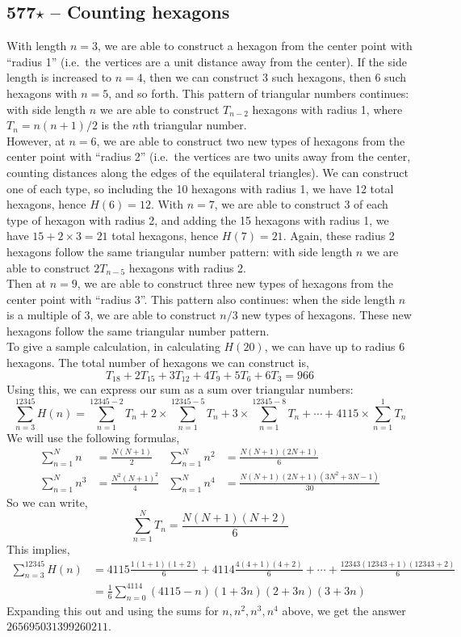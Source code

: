 \documentclass{article}
\begin{document}
\subsection*{577$\star$ -- Counting hexagons}
With length $n=3$, we are able to construct a hexagon from the center point with ``radius 1'' (i.e.~the vertices are a unit distance away from the center).
If the side length is increased to $n=4$, then we can construct 3 such hexagons, then 6 such hexagons with $n=5$, and so forth.
This pattern of triangular numbers continues: with side length $n$ we are able to construct $T_{n-2}$ hexagons with radius 1, where $T_n = n(n+1)/2$ is the $n$th triangular number. \\

However, at $n=6$, we are able to construct two new types of hexagons from the center point with ``radius 2'' (i.e.~the vertices are two units away from the center, counting distances along the edges of the equilateral triangles). 
We can construct one of each type, so including the 10 hexagons with radius 1, we have 12 total hexagons, hence $H(6)=12$.
With $n=7$, we are able to construct 3 of each type of hexagon with radius 2, and adding the 15 hexagons with radius 1, we have $15 + 2\times 3 = 21$ total hexagons, hence $H(7)=21$.
Again, these radius 2 hexagons follow the same triangular number pattern: with side length $n$ we are able to construct $2T_{n-5}$ hexagons with radius 2. \\

Then at $n=9$, we are able to construct three new types of hexagons from the center point with ``radius 3''.
This pattern also continues: when the side length $n$ is a multiple of 3, we are able to construct $n/3$ new types of hexagons.
These new hexagons follow the same triangular number pattern. \\

To give a sample calculation, in calculating $H(20)$, we can have up to radius 6 hexagons.
The total number of hexagons we can construct is,
\[ T_{18} + 2T_{15} + 3 T_{12} + 4 T_{9} + 5 T_{6} + 6 T_{3} = 966 \]
Using this, we can express our sum as a sum over triangular numbers:
\[ \sum_{n=3}^{12345} H(n) = \sum_{n=1}^{12345-2} T_n + 2\times \sum_{n=1}^{12345-5}T_n + 3 \times \sum_{n=1}^{12345-8} T_n + \cdots + 4115 \times \sum_{n=1}^1 T_n \]
We will use the following formulas,
\begin{align*}
\sum_{n=1}^N n &= \frac{N(N+1)}{2} & \sum_{n=1}^N n^2 &= \frac{N(N+1)(2N+1)}{6} \\
\sum_{n=1}^N n^3 &= \frac{N^2 (N+1)^2}{4} & \sum_{n=1}^N n^4 &= \frac{N(N+1)(2N+1)(3N^2 + 3N - 1)}{30}
\end{align*}
So we can write,
\[ \sum_{n=1}^N T_n = \frac{N(N+1)(N+2)}{6} \]
This implies,
\begin{align*}
\sum_{n=3}^{12345} H(n) &= 4115 \frac{1(1+1)(1+2)}{6} + 4114 \frac{4(4+1)(4+2)}{6} + \cdots +\frac{12343(12343+1)(12343+2)}{6} \\
&= \frac{1}{6} \sum_{n=0}^{4114} (4115-n)(1+3n)(2+3n)(3+3n)
\end{align*}
Expanding this out and using the sums for $n, n^2, n^3, n^4$ above, we get the answer $\boxed{ 265695031399260211} $.
\end{document}
